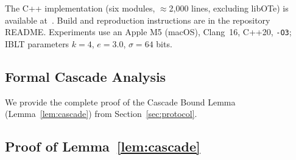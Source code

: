 \documentclass[letterpaper,twocolumn,10pt]{article}
\theoremstyle{definition}
\begin{document}
The C++ implementation (six modules, $\approx$2,000 lines, excluding
libOTe) is available at~\cite{code}. Build and reproduction instructions
are in the repository README. Experiments use an Apple M5 (macOS),
Clang~16, C++20, \texttt{-O3}; IBLT parameters $k=4$, $e=3.0$,
$\sigma=64$ bits.

\subsection{Formal Cascade Analysis}
\label{sec:formal-cascade}

We provide the complete proof of the Cascade Bound Lemma
(Lemma~\ref{lem:cascade}) from Section~\ref{sec:protocol}.

\subsection{Proof of Lemma~\ref{lem:cascade}}
\end{document}

